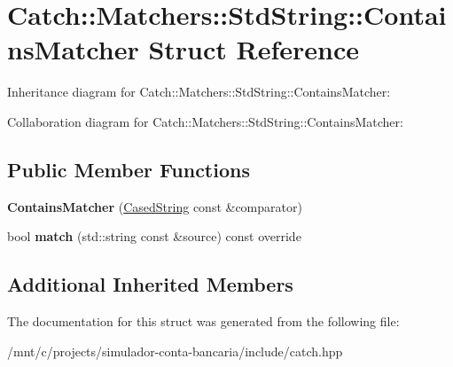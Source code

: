 \hypertarget{structCatch_1_1Matchers_1_1StdString_1_1ContainsMatcher}{}\section{Catch\+:\+:Matchers\+:\+:Std\+String\+:\+:Contains\+Matcher Struct Reference}
\label{structCatch_1_1Matchers_1_1StdString_1_1ContainsMatcher}


Inheritance diagram for Catch\+:\+:Matchers\+:\+:Std\+String\+:\+:Contains\+Matcher\+:


Collaboration diagram for Catch\+:\+:Matchers\+:\+:Std\+String\+:\+:Contains\+Matcher\+:
\subsection*{Public Member Functions}
\begin{DoxyCompactItemize}
\item 
\mbox{\label{structCatch_1_1Matchers_1_1StdString_1_1ContainsMatcher_acc892883c8409e34b28c9b39d4ef1fe3}} 
{\bfseries Contains\+Matcher} (\hyperlink{structCatch_1_1Matchers_1_1StdString_1_1CasedString}{Cased\+String} const \&comparator)
\item 
\mbox{\label{structCatch_1_1Matchers_1_1StdString_1_1ContainsMatcher_a630628b234b037be83fe587081a80b53}} 
bool {\bfseries match} (std\+::string const \&source) const override
\end{DoxyCompactItemize}
\subsection*{Additional Inherited Members}


The documentation for this struct was generated from the following file\+:\begin{DoxyCompactItemize}
\item 
/mnt/c/projects/simulador-\/conta-\/bancaria/include/catch.\+hpp\end{DoxyCompactItemize}

